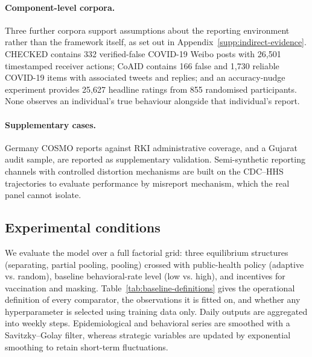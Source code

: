 \documentclass[sigconf,review]{acmart}
\begin{document}
\paragraph{Component-level corpora.}
Three further corpora support assumptions about the reporting environment rather than the
framework itself, as set out in Appendix~\ref{supp:indirect-evidence}. CHECKED contains 332
verified-false COVID-19 Weibo posts with 26,501 timestamped receiver actions; CoAID
contains 166 false and 1,730 reliable COVID-19 items with associated tweets and replies;
and an accuracy-nudge experiment provides 25,627 headline ratings from 855 randomised
participants. None observes an individual's true behaviour alongside that individual's
report.

\paragraph{Supplementary cases.}
Germany COSMO reports against RKI administrative coverage, and a Gujarat audit sample, are
reported as supplementary validation. Semi-synthetic reporting channels with controlled
distortion mechanisms are built on the CDC--HHS trajectories to evaluate performance by
misreport mechanism, which the real panel cannot isolate.

\subsection{Experimental conditions}
We evaluate the model over a full factorial grid: three equilibrium structures (separating, partial pooling, pooling) crossed with public-health policy (adaptive vs. random), baseline behavioral-rate level (low vs. high), and incentives for vaccination and masking. Table~\ref{tab:baseline-definitions} gives the operational definition of every comparator, the observations it is fitted on, and whether any hyperparameter is selected using training data only.
Daily outputs are aggregated into weekly steps. Epidemiological and behavioral series are smoothed with a Savitzky--Golay filter, whereas strategic variables are updated by exponential smoothing to retain short-term fluctuations.
\end{document}
